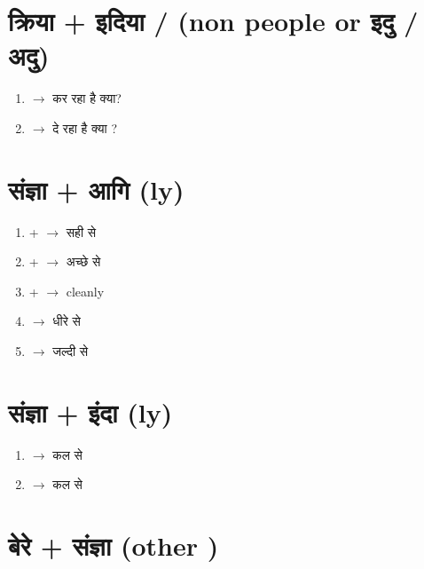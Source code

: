 \documentclass{article}
\begin{document}
\section{\s क्रिया + इदिया / (non people or इदु / अदु)}
\begin{enumerate}
    \item {\s {} $\longrightarrow$ \s कर रहा है क्या? } 
    \item {\s {} $\longrightarrow$ \s दे रहा है क्या ? } 
\end{enumerate}


\section{\s संज्ञा + आगि (ly)}
\begin{multicols}{2}

\begin{enumerate}
    \item {\s {} +  $\longrightarrow$ \s सही से } 
    \item {\s {} +  $\longrightarrow$ \s अच्छे से } 
    \item {\s {} +  $\longrightarrow$ \s cleanly} 

    \item {\s {} $\longrightarrow$ \s धीरे से } 
    \item {\s {} $\longrightarrow$ \s जल्दी से } 
\end{enumerate}
\end{multicols}

\section{\s संज्ञा + इंदा (ly)}
\begin{multicols}{2}

\begin{enumerate}
    \item {\s {} $\longrightarrow$ \s कल से } 
    \item {\s {} $\longrightarrow$ \s कल से } 
\end{enumerate}
\end{multicols}


\section{\s बेरे + संज्ञा  (other )}
\end{document}
